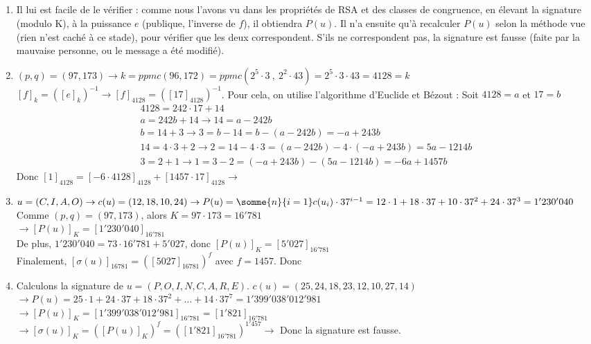 \documentclass[10p,a4paper]{scrartcl}
\begin{document}
\subsection{}
\begin{enumerate}
	\item	Il lui est facile de le vérifier : comme nous l'avons vu dans les propriétés de RSA et des classes de congruence, en élevant la signature (modulo K), à la puissance $e$ (publique, l'inverse de $f$), il obtiendra $P(u)$. Il n'a ensuite qu'à recalculer $P(u)$ selon la méthode vue (rien n'est caché à ce stade), pour vérifier que les deux correspondent. S'ils ne correspondent pas, la signature est fausse (faite par la mauvaise personne, ou le message a été modifié).
	\item	$(p,q) = (97,173) \to k = ppmc(96,172) = ppmc(2^5\cdot 3\ ,\ 2^2 \cdot 43) = 2^5 \cdot 3 \cdot 43 = 4128 = k$\\
			$[f]_k = ([e]_k)^{-1} \to [f]_{4128} = ([17]_{4128})^{-1}$. Pour cela, on utilise l'algorithme d'Euclide et Bézout : Soit $4128 = a$ et $17 = b$
			\begin{align*}
				4128 = 242\cdot 17 + 14\\
				a = 242b + 14 \to 14 = a-242b\\
				b = 14 + 3 \to 3 = b-14 = b-(a-242b) = -a + 243b\\
				14 = 4\cdot 3 + 2 \to 2 = 14 - 4\cdot 3 = (a-242b) -4\cdot(-a+243b) = 5a - 1214b\\
				3 = 2 + 1 \to 1 = 3-2 = (-a+243b) - (5a - 1214 b) = -6a + 1457 b
			\end{align*}
			Donc $[1]_{4128} = [-6\cdot 4128]_{4128} + [1457 \cdot 17]_{4128} \to$ 
			
	\item	$u = (C,I,A,O) \to c(u) = (12,18,10,24)\\
			\to P(u) = \somme{n}{i=1} c(u_i)\cdot 37^{i-1} = 12 \cdot 1 + 18\cdot 37 + 10\cdot 37^2 + 24 \cdot37^3 = 1'230'040$\\
			Comme $(p,q) = (97,173)$, alors $K = 97\cdot 173 = 16'781$\\			
			$\to [P(u)]_K = [1'230'040]_{16'781}$\\
			De plus, $1'230'040 = 73\cdot 16'781 + 5'027$, donc $[P(u)]_K = [5'027]_{16'781}$\\
			Finalement, $[\sigma(u)]_{16781} = ([5027]_{16781})^{f}$ avec $f = 1457$. Donc 
			
	\item	Calculons la signature de $u = (P,O,I,N,C,A,R,E)$. $c(u) = (25, 24, 18, 23, 12, 10, 27, 14)$\\
	 		$\to P(u) = 25\cdot1 + 24\cdot37 + 18\cdot 37^2 + \ldots + 14 \cdot 37^7 = 	1'399'038'012'981$\\
	 		$\to [P(u)]_K = [1'399'038'012'981]_{16'781} = [1'821]_{16'781}$\\
	 		$\to [\sigma(u)]_K = ([P(u)]_K)^f = ([1'821]_{16'781})^{1'457} \to$  Donc la signature est fausse.
	 		

\end{enumerate}
\end{document}

